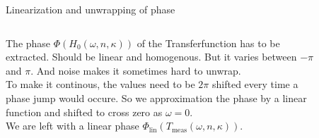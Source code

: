 \documentclass[aspectratio=1610, 9pt]{beamer}
\begin{document}
\begin{frame}{Linearization and unwrapping of phase}
  \begin{columns}
    \begin{column}{0.4\textwidth}
      The phase $\Phi(H_0(\omega, n, \kappa))$ of the Transferfunction has to be extracted.
      Should be linear and homogenous.
      But it varies between $-\pi$ and $\pi$. And noise makes it sometimes hard to unwrap.\\
      \vspace*{0.5cm}
      To make it continous, the values need to be $2\pi$ shifted every time a phase jump would occure.
      So we approximation the phase by a linear function and shifted to cross zero as $\omega=0$.\\
      We are left with a linear phase $\Phi_\text{lin}(T_\text{meas}(\omega, n, \kappa))$.
    \end{column}
    \begin{column}{0.6\textwidth}
      \begin{figure}
      \end{figure}
    \end{column}
  \end{columns}
\end{frame}
\end{document}
